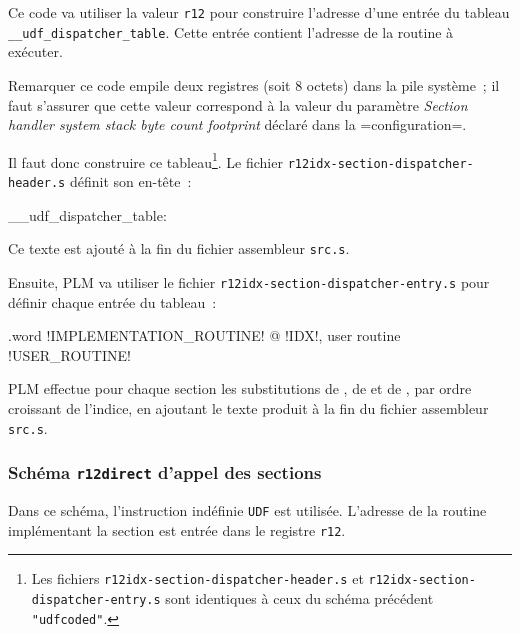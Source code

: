Ce code va utiliser la valeur \texttt{r12} pour construire l'adresse d'une entrée du tableau \texttt{\_\_udf\_dispatcher\_table}. Cette entrée contient l'adresse de la routine à exécuter.

Remarquer ce code empile deux registres (soit 8 octets) dans la pile système~; il faut s'assurer que cette valeur correspond à la valeur du paramètre \emph{Section handler system stack byte count footprint} déclaré dans la \plm=configuration=.

Il faut donc construire ce tableau\footnote{Les fichiers \texttt{r12idx-section-dispatcher-header.s} et \texttt{r12idx-section-dispatcher-entry.s} sont identiques à ceux du schéma précédent \texttt{"udfcoded"}.}. Le fichier \texttt{r12idx-section-dispatcher-header.s} définit son en-tête~:

\begin{SHELL}\small
\_\_udf\_dispatcher\_table:
\end{SHELL}

Ce texte est ajouté à la fin du fichier assembleur \texttt{src.s}.

Ensuite, PLM va utiliser le fichier \texttt{r12idx-section-dispatcher-entry.s} pour définir chaque entrée du tableau~:
\begin{SHELL}\small
\hspace*{1.2em}.word !IMPLEMENTATION\_ROUTINE! @ !IDX!, user routine !USER\_ROUTINE!

\end{SHELL}

PLM effectue pour chaque section les substitutions de , de  et de , par ordre croissant de l'indice, en ajoutant le texte produit à la fin du fichier assembleur \texttt{src.s}.











\subsubsection{Schéma \texttt{r12direct} d'appel des sections}

Dans ce schéma, l'instruction indéfinie \texttt{UDF} est utilisée. L'adresse de la routine implémentant la section est entrée dans le registre \texttt{r12}.

